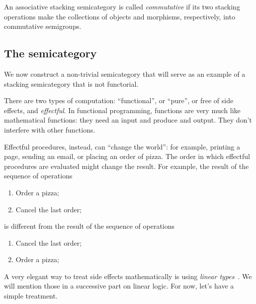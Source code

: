%
\begin{definition}
    An associative stacking semicategory is called \emph{commutative} if its two stacking operations make the collections of objects and morphisms, respectively, into commutative semigroups.
\end{definition}

\subsection{The semicategory \Effects}

We now construct a non-trivial semicategory that will serve as an example of a stacking semicategory that is not functorial.

There are two types of computation: ``functional'', or ``pure'', or free of side effects, and \emph{effectful}.
In functional programming, functions are very much like mathematical functions: they need an input and produce and output.
They don't interfere with other functions.

Effectful procedures,  instead, can ``change the world'': for example, printing a page, sending an email, or placing an order of pizza.
The order in which effectful procedures are evaluated might change the result.
For example, the result of the sequence of operations
%
\begin{enumerate}
    \item Order a pizza;
    \item Cancel the last order;
\end{enumerate}
%
is different from the result of the sequence of operations
%
\begin{enumerate}
    \item Cancel the last order;
    \item Order a pizza;
\end{enumerate}

A very elegant way to treat side effects mathematically is using \emph{linear types}~\cite{Wadler90lineartypes}.
We will mention those in a successive part on linear logic.
For now, let's have a simple treatment.

\begin{marginfigure}
    \centering
    \\
    \caption{}
    \label{fig:effects12}
\end{marginfigure}


